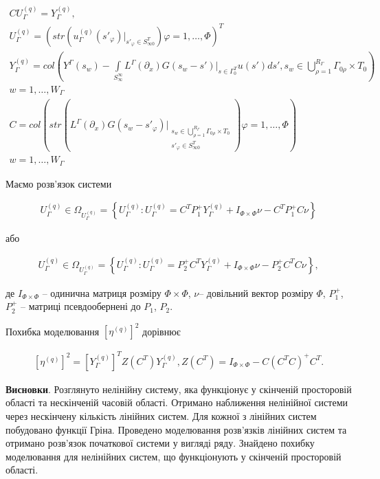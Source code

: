 \begin{gather*}
    CU^{(q)}_{\Gamma} = Y^{(q)}_{\Gamma},\\
    U^{(q)}_{\Gamma}=\left(str\left( u^{(q)}_{\Gamma}
    (s'_{\varphi})\bigg|_{s'_{\varphi}\in S^{T}_{\infty 0}} \right) \varphi=1,\dots,\Phi \right)^{T}\\
    Y^{(q)}_{\Gamma}=col\left(Y^{\Gamma}(s_{w})
    -\int\limits_{S^{\infty}_{\infty}}L^{\Gamma}(\partial_{x})G(s_{w}-s')\bigg|_{s\in\Gamma^{T}_{0}}u(s')ds',
    s_{w}\in\bigcup\limits_{\rho=1}^{R_{\Gamma}} \Gamma_{0\rho}\times T_{0}
    \right)\\
    w=1,\dots,W_{\Gamma}\\
    C=col\left( str\left(L^{\Gamma}(\partial_{x}) G(s_{w}-s'_{\varphi})
    \bigg|_{\substack{
        s_{w}\in
        \bigcup\limits_{\rho=1}^{R_{\Gamma}} \Gamma_{0\rho}\times T_{0}\\
        s'_{\varphi}\in S^{T}_{\infty 0}
    }}
    \right)\varphi=1,\dots,\Phi \right)\\
    w=1,\dots,W_{\Gamma}
\end{gather*}

Маємо розв'язок системи

\begin{gather*}
    U^{(q)}_{\Gamma}\in\Omega_{U^{(q)}_{\Gamma}}=
    \left\{ U^{(q)}_{\Gamma}:U^{(q)}_{\Gamma}=C^{T}P^{+}_{1}Y^{(q)}_{\Gamma}+I_{\Phi\times\Phi}\nu-C^{T}P^{+}_{1}C\nu \right\}
\end{gather*}

або

\begin{gather*}
    U^{(q)}_{\Gamma}\in\Omega_{U^{(q)}_{\Gamma}}=
    \left\{ U^{(q)}_{\Gamma}:U^{(q)}_{\Gamma}=P^{+}_{2}C^{T}Y^{(q)}_{\Gamma}+I_{\Phi\times\Phi}\nu-P^{+}_{2}C^{T}C\nu \right\},
\end{gather*}

де $I_{\Phi\times\Phi}$ -- одинична матриця розміру $\Phi\times\Phi$, $\nu$-- довільний вектор розміру $\Phi$,
$P^{+}_{1}$, $P^{+}_{2}$ -- матриці псевдообернені до $P_{1}$, $P_{2}$.

Похибка моделювання $\left[ \eta^{(q)} \right]^{2}$ дорівнює

\begin{gather*}
    \left[ \eta^{(q)} \right]^{2}=\left[ Y^{(q)}_{\Gamma} \right]^T Z\left( C^{T} \right)Y^{(q)}_{\Gamma},
    Z(C^{T})=I_{\Phi\times\Phi}-C\left( C^{T}C \right)^{+}C^{T}.
\end{gather*}

\textbf{Висновки}.
Розглянуто нелінійну систему, яка функціонує у скінченій просторовій області та нескінченій
часовій області.
Отримано наближення нелінійної системи через нескінчену кількість лінійних систем.
Для кожної з лінійних систем побудовано функції Гріна.
Проведено моделювання розв'язків лінійних систем та отримано розв'язок початкової системи у вигляді ряду.
Знайдено похибку моделювання для нелінійних систем, що функціонують у скінченій просторовій області.

